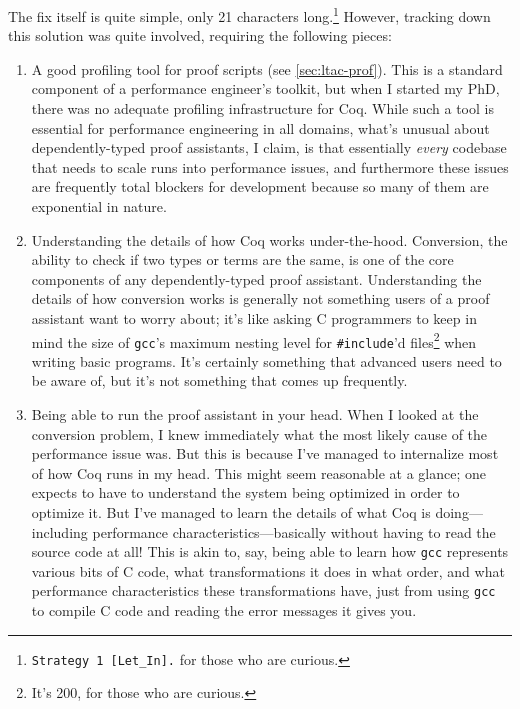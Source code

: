 The fix itself is quite simple, only 21 characters long.\footnote{\texttt{Strategy 1 [Let\_In].} for those who are curious.}
However, tracking down this solution was quite involved, requiring the following pieces:
\begin{enumerate}
  \item
    A good profiling tool for proof scripts (see \autoref{sec:ltac-prof}).
    This is a standard component of a performance engineer's toolkit, but when I started my PhD, there was no adequate profiling infrastructure for Coq.
    While such a tool is essential for performance engineering in all domains, what's unusual about dependently-typed proof assistants, I claim, is that essentially \emph{every} codebase that needs to scale runs into performance issues, and furthermore these issues are frequently total blockers for development because so many of them are exponential in nature.
  \item
    Understanding the details of how Coq works under-the-hood.
    Conversion, the ability to check if two types or terms are the same, is one of the core components of any dependently-typed proof assistant.
    Understanding the details of how conversion works is generally not something users of a proof assistant want to worry about; it's like asking C programmers to keep in mind the size of \texttt{gcc}'s maximum nesting level for \texttt{\#include}'d files\footnote{It's 200, for those who are curious.} when writing basic programs.
    It's certainly something that advanced users need to be aware of, but it's not something that comes up frequently.
  \item
    Being able to run the proof assistant in your head.
    When I looked at the conversion problem, I knew immediately what the most likely cause of the performance issue was.
    But this is because I've managed to internalize most of how Coq runs in my head.
    This might seem reasonable at a glance; one expects to have to understand the system being optimized in order to optimize it.
    But I've managed to learn the details of what Coq is doing---including performance characteristics---basically without having to read the source code at all!
    This is akin to, say, being able to learn how \texttt{gcc} represents various bits of C code, what transformations it does in what order, and what performance characteristics these transformations have, just from using \texttt{gcc} to compile C code and reading the error messages it gives you.

\end{enumerate}
